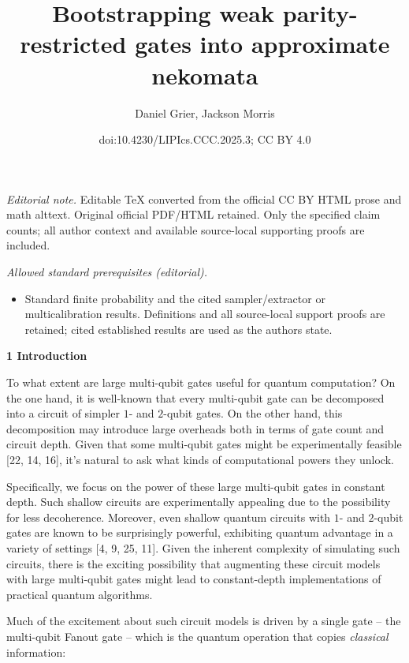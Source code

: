 \documentclass[10pt,a4paper]{article}
\title{Bootstrapping weak parity-restricted gates into approximate nekomata}
\author{Daniel Grier, Jackson Morris}
\date{doi:10.4230/LIPIcs.CCC.2025.3; CC BY 4.0}
\begin{document}
\maketitle
\noindent\textit{Editorial note.} Editable TeX converted from the official CC BY HTML prose and math alttext. Original official PDF/HTML retained. Only the specified claim counts; all author context and available source-local supporting proofs are included.\par\medskip
\noindent\textit{Allowed standard prerequisites (editorial).}\begin{itemize}
\item Standard finite probability and the cited sampler/extractor or multicalibration results. Definitions and all source-local support proofs are retained; cited established results are used as the authors state.
\end{itemize}\medskip


\par\medskip\noindent\textbf{
1 Introduction}\par




To what extent are large multi-qubit gates useful for quantum computation? On the one hand, it is well-known that every multi-qubit gate can be decomposed into a circuit of simpler $1$- and $2$-qubit gates. On the other hand, this decomposition may introduce large overheads both in terms of gate count and circuit depth. Given that some multi-qubit gates might be experimentally feasible [22, 14, 16], it’s natural to ask what kinds of computational powers they unlock.\par




Specifically, we focus on the power of these large multi-qubit gates in constant depth. Such shallow circuits are experimentally appealing due to the possibility for less decoherence. Moreover, even shallow quantum circuits with $1$- and $2$-qubit gates are known to be surprisingly powerful, exhibiting quantum advantage in a variety of settings [4, 9, 25, 11]. Given the inherent complexity of simulating such circuits, there is the exciting possibility that augmenting these circuit models with large multi-qubit gates might lead to constant-depth implementations of practical quantum algorithms.\par




Much of the excitement about such circuit models is driven by a single gate – the multi-qubit Fanout gate – which is the quantum operation that copies \emph{classical} information:\par
\end{document}
